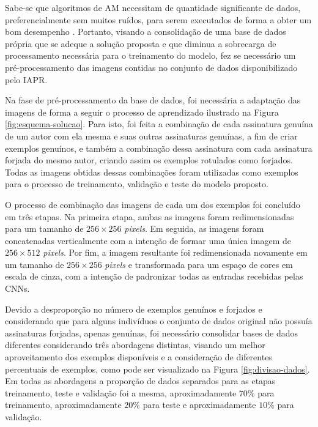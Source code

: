 Sabe-se que algoritmos de AM necessitam de quantidade significante de dados, preferencialmente sem muitos ruídos, para serem executados de forma a obter um bom desempenho \cite{marsland}. Portanto, visando a consolidação de uma base de dados própria que se adeque a solução proposta e que diminua a sobrecarga de processamento necessária para o treinamento do modelo, fez se necessário um pré-processamento das imagens contidas no conjunto de dados disponibilizado pelo IAPR.

Na fase de pré-processamento da base de dados, foi necessária a adaptação das imagens de forma a seguir o processo de aprendizado ilustrado na Figura \ref{fig:esquema-solucao}. Para isto, foi feita a combinação de cada assinatura genuína de um autor com ela mesma e suas outras assinaturas genuínas, a fim de criar exemplos genuínos, e também a combinação dessa assinatura com cada assinatura forjada do mesmo autor, criando assim os exemplos rotulados como forjados. Todas as imagens obtidas dessas combinações foram utilizadas como exemplos para o processo de treinamento, validação e teste do modelo proposto.

O processo de combinação das imagens de cada um dos exemplos foi concluído em três etapas. Na primeira etapa, ambas as imagens foram redimensionadas para um tamanho de $256 \times 256$ \emph{pixels}. Em seguida, as imagens foram concatenadas verticalmente com a intenção de formar uma única imagem de $256 \times 512$ \emph{pixels}. Por fim, a imagem resultante foi redimensionada novamente em um tamanho de $256 \times 256$ \emph{pixels} e transformada para um espaço de cores em escala de cinza, com a intenção de padronizar todas as entradas recebidas pelas CNNs.


Devido a desproporção no número de exemplos genuínos e forjados e considerando que para alguns indivíduos o conjunto de dados original não possuía assinaturas forjadas, apenas genuínas, foi necessário consolidar bases de dados diferentes considerando três abordagens distintas, visando um melhor aproveitamento dos exemplos disponíveis e a consideração de diferentes percentuais de exemplos, como pode ser visualizado na Figura \ref{fig:divisao-dados}. Em todas as abordagens a proporção de dados separados para as etapas treinamento, teste e validação foi a mesma, aproximadamente $70\%$ para treinamento, aproximadamente $20\%$ para teste e aproximadamente $10\%$ para validação. %

